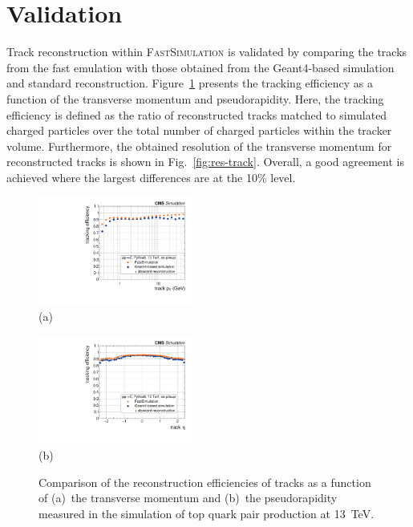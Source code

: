 \documentclass[a4paper]{jpconf}
\begin{document}
\section{Validation}

Track reconstruction within \textsc{FastSimulation} is validated by comparing the tracks from the fast emulation with those obtained from the Geant4-based simulation and standard reconstruction. Figure~\ref{fig:eff-tracks} presents the tracking efficiency as a function of the transverse momentum and pseudorapidity. Here, the tracking efficiency is defined as the ratio of reconstructed tracks matched to simulated charged particles over the total number of charged particles within the tracker volume. Furthermore, the obtained resolution of the transverse momentum for reconstructed tracks is shown in Fig.~\ref{fig:res-track}. Overall, a good agreement is achieved where the largest differences are at the 10\% level.

\begin{figure}[htbp]
\begin{center}
\parbox{0.46\textwidth}{\centering\includegraphics[width=0.45\textwidth]{figures/eff_pt.pdf}\\(a)}
\hspace{0.05\textwidth}
\parbox{0.46\textwidth}{\centering\includegraphics[width=0.45\textwidth]{figures/eff_eta.pdf}\\(b)}
\caption{\label{fig:eff-tracks}Comparison of the reconstruction efficiencies of tracks as a function of (a)~the transverse momentum and (b)~the pseudorapidity measured in the simulation of top quark pair production at 13~TeV.}
\end{center}
\end{figure}
\end{document}

